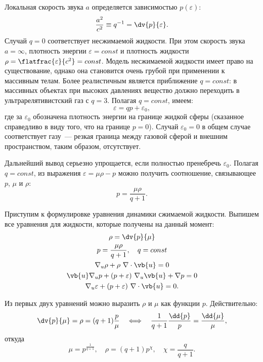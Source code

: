 \documentclass[\docroot/reports/draft/report.tex]{subfiles}
\begin{document}
    Локальная скорость звука $a$ определяется зависимостью $p(\varepsilon)$:
    \begin{equation*}
        \frac{a^2}{c^2} \equiv q^{-1} = \dv{p}{\varepsilon} .
    \end{equation*}
    Случай $q = 0$ соответствует несжимаемой жидкости. При этом скорость звука $a = \infty$, плотность энергии $\varepsilon = const$ и плотность жидкости $\rho = \flatfrac{\varepsilon}{c^2} = const$. Модель несжимаемой жидкости имеет право на существование, однако она становится очень грубой при применении к массивным телам. Более реалистичным является приближение $q = const$: в массивных объектах при высоких давлениях вещество должно переходить в ультрарелятивистский газ \cite{oppenheimer_volkoff,burlankov_new_phys,landau_v5} с $q = 3$. Полагая $q = const$, имеем:
    \begin{equation*}
        \varepsilon = q p + \varepsilon_0 ,
    \end{equation*}
    где за $\varepsilon_0$ обозначена плотность энергии на границе жидкой сферы (сказанное справедливо в виду того, что на границе $p = 0$). Случай $\varepsilon_0 = 0$ в общем случае соответствует газу~--- резкая граница между газовой сферой и внешним пространством, таким образом, отсутствует.

    Дальнейший вывод серьезно упрощается, если полностью пренебречь $\varepsilon_0$. Полагая $q = const$, из выражения $\varepsilon = \mu\rho - p$ можно получить соотношение, связывающее $p$, $\mu$ и $\rho$:
    \begin{equation}
        p = \frac{\mu\rho}{q + 1} .
    \end{equation}

    Приступим к формулировке уравнения динамики сжимаемой жидкости. Выпишем все уравнения для жидкости, которые получены на данный момент:
    \begin{gather}
        \rho = \dv{p}{\mu} \\
        p = \frac{\mu\rho}{q + 1} , \quad q = const \\
        \nabla_u \rho + \rho\ \nabla \cdot \vb{u} = 0 \\
        \vb{u} \nabla_u p + (p + \varepsilon)\ \nabla_u \vb{u} + \nabla p = 0 \\
        \nabla_u \varepsilon + (p + \varepsilon)\ \nabla \cdot \vb{u} = 0 .
    \end{gather}

    Из первых двух уравнений можно выразить $\rho$ и $\mu$ как функции $p$. Действительно:
    \begin{equation*}
        \dv{p}{\mu} = \rho = (q + 1) \frac{p}{\mu} \quad\Longleftrightarrow\quad
        \frac{1}{q + 1} \frac{\dd{p}}{p} = \frac{\dd{\mu}}{\mu} ,
    \end{equation*}
    откуда
    \begin{equation*}
        \mu = p^{\frac{1}{q + 1}} , \quad \rho = (q + 1) p^{\chi} , \quad \chi = \frac{q}{q + 1} .
    \end{equation*}
\end{document}
